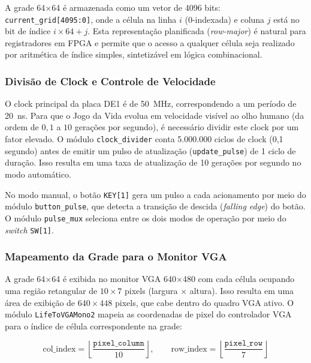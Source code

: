 \documentclass[12pt, a4paper]{article}
\begin{document}
	A grade 64$\times$64 é armazenada como um vetor de 4096 bits:
	\texttt{current\_grid[4095:0]}, onde a célula na linha $i$ (0-indexada) e coluna
	$j$ está no bit de índice $i \times 64 + j$. Esta representação planificada
	(\textit{row-major}) é natural para registradores em FPGA e permite que o acesso
	a qualquer célula seja realizado por aritmética de índice simples, sintetizável
	em lógica combinacional.
	
	\subsubsection{Divisão de Clock e Controle de Velocidade}
	
	O clock principal da placa DE1 é de 50~MHz, correspondendo a um período de
	20~ns. Para que o Jogo da Vida evolua em velocidade visível ao olho humano
	(da ordem de $0{,}1$ a $10$ gerações por segundo), é necessário dividir este
	clock por um fator elevado. O módulo \texttt{clock\_divider} conta 5.000.000
	ciclos de clock (0,1 segundo) antes de emitir um pulso de atualização
	(\texttt{update\_pulse}) de 1 ciclo de duração. Isso resulta em uma taxa de
	atualização de 10 gerações por segundo no modo automático.
	
	No modo manual, o botão \texttt{KEY[1]} gera um pulso a cada acionamento por
	meio do módulo \texttt{button\_pulse}, que detecta a transição de descida
	(\textit{falling edge}) do botão. O módulo \texttt{pulse\_mux} seleciona entre
	os dois modos de operação por meio do \textit{switch} \texttt{SW[1]}.
	
	\subsubsection{Mapeamento da Grade para o Monitor VGA}
	
	A grade 64$\times$64 é exibida no monitor VGA 640$\times$480 com cada célula
	ocupando uma região retangular de $10 \times 7$ pixels (largura $\times$ altura).
	Isso resulta em uma área de exibição de $640 \times 448$ pixels, que cabe dentro
	do quadro VGA ativo. O módulo \texttt{LifeToVGAMono2} mapeia as coordenadas de
	pixel do controlador VGA para o índice de célula correspondente na grade:
	
	\begin{equation}
		\text{col\_index} = \left\lfloor \frac{\texttt{pixel\_column}}{10} \right\rfloor, \qquad
		\text{row\_index} = \left\lfloor \frac{\texttt{pixel\_row}}{7} \right\rfloor
		\label{eq:mapeamento}
	\end{equation}
	
\end{document}
